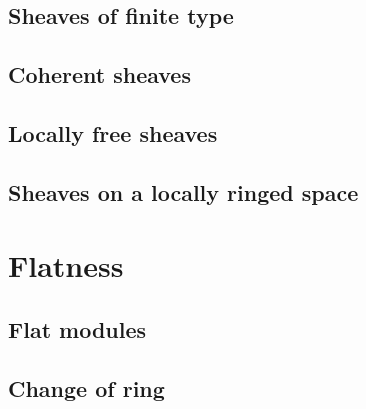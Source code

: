 \documentclass{book}
\begin{document}
        \subsection{Sheaves of finite type}

        \label{0-prelim-5.2}

        



        \subsection{Coherent sheaves}

        \label{0-prelim-5.3}

        



        \subsection{Locally free sheaves}

        \label{0-prelim-5.4}

        



        \subsection{Sheaves on a locally ringed space}

        \label{0-prelim-5.5}

        



    \section{Flatness}

    \label{0-prelim-6}



        \subsection{Flat modules}

        \label{0-prelim-6.1}

        



        \subsection{Change of ring}
\end{document}
